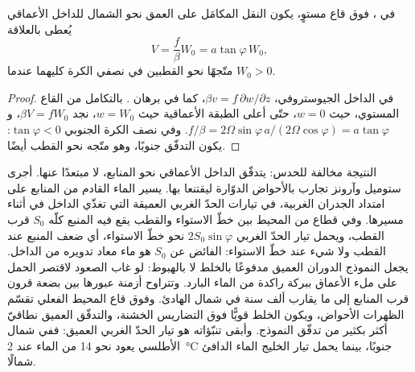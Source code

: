 \begin{proposition}\label{prop:b3:ocean-dynamics:abyssal}
في ، فوق قاع مستوٍ، يكون النقل المكامَل على العمق
نحو الشمال للداخل الأعماقي يُعطى بالعلاقة
\[
V = \frac{f}{\beta}W_0 = a\tan\varphi\,W_0 ,
\]
متّجهًا نحو القطبين في نصفي الكرة كليهما عندما $W_0 > 0$.
\end{proposition}

\begin{proof}
في الداخل الجيوستروفي، $\beta v = f\,\partial w/\partial z$، كما في
برهان . بالتكامل من القاع المستوي، حيث
$w = 0$، حتّى أعلى الطبقة الأعماقية حيث $w = W_0$، نجد $\beta V =
fW_0$، و$f/\beta = 2\Omega\sin\varphi\,a/(2\Omega\cos\varphi) =
a\tan\varphi$. وفي نصف الكرة الجنوبي $\tan\varphi < 0$: يكون التدفّق
جنوبًا، وهو متّجه نحو القطب أيضًا.
\end{proof}

النتيجة مخالفة للحدس: يتدفّق الداخل الأعماقي نحو
المنابع، لا مبتعدًا عنها. أجرى ستوميل وآرونز تجارب بالأحواض الدوّارة
ليقتنعا بها. يسير الماء القادم من المنابع
على امتداد الجدران الغربية، في تيارات الحدّ الغربي العميقة التي تغذّي
الداخل في أثناء مسيرها. وفي قطاع من المحيط بين خطّ الاستواء والقطب
يقع فيه المنبع كلّه $S_0$ قرب القطب، ويحمل تيار الحدّ الغربي
$2S_0\sin\varphi$ نحو خطّ الاستواء، أي ضعف المنبع عند القطب
ولا شيء عند خطّ الاستواء: الفائض عن $S_0$ هو ماء معاد تدويره
من الداخل. يجعل النموذج الدوران العميق مدفوعًا بالخلط
لا بالهبوط: لو غاب الصعود لاقتصر الحمل على ملء
الأعماق ببركة راكدة من الماء البارد. وتتراوح أزمنة عبورها بين
بضعة قرون قرب المنابع إلى ما يقارب ألف سنة في شمال
الهادئ. وفوق قاع المحيط الفعلي تقسّم الظهرات الأحواض، ويكون الخلط
قويًّا فوق التضاريس الخشنة، والتدفّق العميق نطاقيّ أكثر بكثير من
تدفّق النموذج. وأبقى تنبّؤاته هو تيار الحدّ الغربي العميق: ففي
شمال الأطلسي يعود نحو \qty{14}{\sverdrup} من الماء
عند \qty{2}{\celsius} جنوبًا، بينما يحمل تيار الخليج الماء الدافئ
شمالًا.

